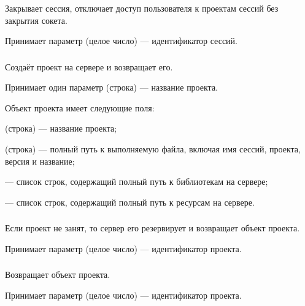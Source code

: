 \subsubsection{}

Закрывает сессия, отключает доступ пользователя к проектам сессий без закрытия сокета.

Принимает параметр  (целое число) — идентификатор сессий.

\subsubsection{}

Создаёт проект на сервере и возвращает его.

Принимает один параметр  (строка) — название проекта.

Объект проекта имеет следующие поля:

\begin{icItems}
	\item {} (строка) — название проекта;
	\item {} (строка) — полный путь к выполняемую файла, включая имя сессий, проекта, версия и название;
	\item {} — список строк, содержащий полный путь к библиотекам на сервере;
	\item {} — список строк, содержащий полный путь к ресурсам на сервере.
\end{icItems}

\subsubsection{}

Если проект не занят, то сервер его резервирует и возвращает объект проекта.

Принимает параметр  (целое число) — идентификатор проекта.

\subsubsection{}

Возвращает объект проекта.

Принимает параметр  (целое число) — идентификатор проекта.

\subsubsection{}

